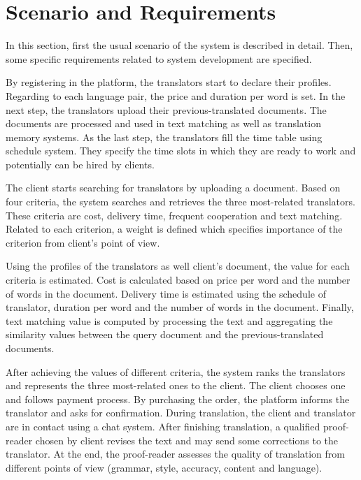 \section{Scenario and Requirements}
\label{sec:scenario}
In this section, first the usual scenario of the system is described in detail. Then, some specific requirements related to system development are specified.

By registering in the platform, the translators start to declare their profiles. Regarding to each language pair, the price and duration per word is set. In the next step, the translators upload their previous-translated documents. The documents are processed and used in text matching as well as  translation memory systems. As the last step, the translators fill the time table using schedule system. They specify the time slots in which they are ready to work and potentially can be hired by clients.

The client starts searching for translators by uploading a document. Based on four criteria, the system searches and retrieves the three most-related translators. These criteria are cost, delivery time, frequent cooperation and text matching. Related to each criterion, a weight is defined which specifies importance of the criterion from client's point of view.

Using the profiles of the translators as well client's document, the value for each criteria is estimated. Cost is calculated based on price per word and the number of words in the document. Delivery time is estimated using the schedule of translator, duration per word and the number of words in the document. Finally, text matching value is computed by processing the text and aggregating the similarity values between the query document and the previous-translated documents.

After achieving the values of different criteria, the system ranks the translators and represents the three most-related ones to the client. The client chooses one and follows payment process. By purchasing the order, the platform informs the translator and asks for confirmation. During translation, the client and translator are in contact using a chat system. After finishing translation, a qualified proof-reader chosen by client revises the text and may send some corrections to the translator. At the end, the proof-reader assesses the quality of translation from different points of view (grammar, style, accuracy, content and language).

